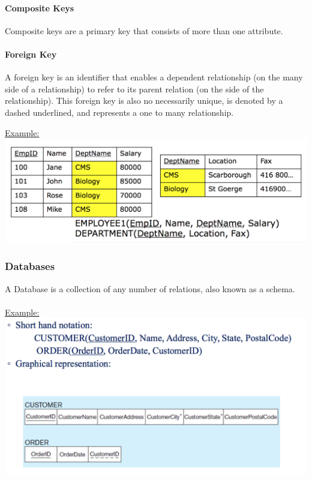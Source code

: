 \documentclass[12pt]{article}
\begin{document}
\paragraph{Composite Keys} Composite keys are a primary key that consists of more than one attribute.

\paragraph{Foreign Key} A foreign key is an identifier that enables a dependent relationship (on the many side of a relationship) to refer to its parent relation (on the side of the relationship). This foreign key is also no necessarily unique, is denoted by a dashed underlined, and represents a one to many relationship.

\underline{Example:}\\
\includegraphics[scale=0.5]{lec4-1}

\subsubsection{Databases}

A Database is a collection of any number of relations, also known as a schema.\\
\\
\underline{Example:}\\
\includegraphics[scale=0.5]{lec4-2}
\end{document}
